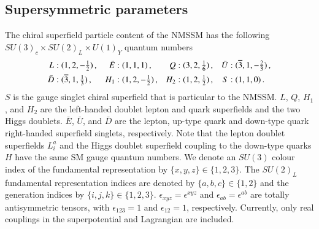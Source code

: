 \documentclass[final,3p,times,pdflatex]{elsarticle}
\begin{document}
\subsection{Supersymmetric parameters \label{susypars}}
The chiral superfield particle content of the NMSSM has the 
following $SU(3)_c\times SU(2)_L\times U(1)_Y$ quantum numbers
\begin{align}
L&:(1,2,-\tfrac{1}{2})\,, & \bar{E}&:(1,1,1)\,, & 
Q&:(3,2,\tfrac{1}{6})\,,  & \bar{U}&:(\overline 3,1,-\tfrac{2}{3})\,, \notag \\
\bar{D}&:(\overline 3,1,\tfrac{1}{3})\,, & H_1&:(1,2,-\tfrac{1}{2})\,, & 
H_2&:(1,2,\tfrac{1}{2})\,, & S&:(1,1,0)\,.
\label{fields}
\end{align}
$S$ is the gauge singlet chiral superfield that is particular to the NMSSM. 
$L$, $Q$, $H_1$, and $H_2$ are the left-handed doublet lepton and quark 
superfields and the two Higgs doublets. $\bar{E}$, $\bar{U}$, and $\bar{D}$ are 
the lepton, up-type quark and down-type quark right-handed superfield singlets, 
respectively. Note that the lepton doublet superfields $L^a_i$ and the Higgs 
doublet superfield coupling to the down-type quarks $H$ have the same 
SM gauge quantum numbers. We denote an $SU(3)$ colour 
index of the fundamental representation by  $\{x,y,z\} \in \{1,2,3 \}$. The 
$SU(2)_L$ fundamental representation indices are denoted by 
$\{a,b,c\} \in \{1,2\}$ and the generation indices by $\{i,j,k\} \in \{1,2,3\}$.
 $\epsilon_{xyz}=\epsilon^{xyz}$ and  $\epsilon_{ab}=\epsilon^{ab}$ are totally
antisymmetric tensors, with $\epsilon_{123}=1$ and $\epsilon_{12}=1$, 
respectively.  Currently, only real couplings in the superpotential and Lagrangian are 
included. 
\end{document}

